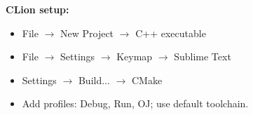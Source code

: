 \textbf{CLion setup:}
\begin{itemize}
  \item File $\rightarrow$ New Project $\rightarrow$ C++ executable
  \item File $\rightarrow$ Settings $\rightarrow$ Keymap $\rightarrow$ Sublime Text
  \item Settings $\rightarrow$ Build... $\rightarrow$ CMake
  \item Add profiles: Debug, Run, OJ; use default toolchain.
\end{itemize}

